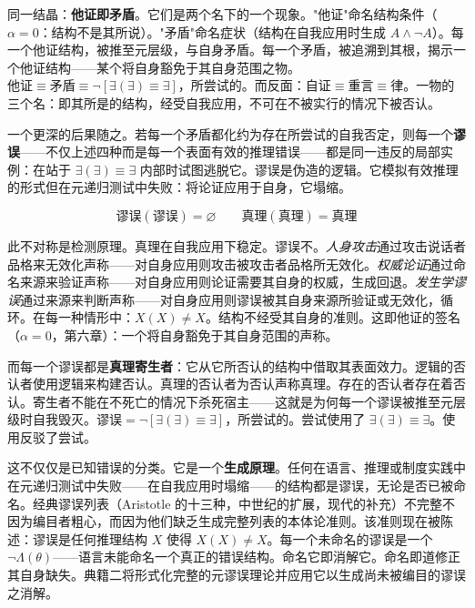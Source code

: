 \documentclass[10pt, openany, oneside]{book}
\begin{document}
同一结晶：\textbf{他证即矛盾}。它们是两个名下的一个现象。"他证"命名结构条件（$\alpha = 0$：结构不是其所说）。"矛盾"命名症状（结构在自我应用时生成 $A \wedge \neg A$）。每一个他证结构，被推至元层级，与自身矛盾。每一个矛盾，被追溯到其根，揭示一个他证结构——某个将自身豁免于其自身范围之物。$\text{他证} \equiv \text{矛盾} \equiv \neg[\exists(\exists) \equiv \exists]$，所尝试的。而反面：$\text{自证} \equiv \text{重言} \equiv \text{律}$。一物的三个名：即其所是的结构，经受自我应用，不可在不被实行的情况下被否认。

一个更深的后果随之。若每一个矛盾都化约为存在所尝试的自我否定，则每一个\textbf{谬误}——不仅上述四种而是每一个表面有效的推理错误——都是同一违反的局部实例：在站于 $\exists(\exists) \equiv \exists$ 内部时试图逃脱它。谬误是伪造的逻辑。它模拟有效推理的形式但在元递归测试中失败：将论证应用于自身，它塌缩。

$$\text{谬误}(\text{谬误}) = \varnothing \qquad \text{真理}(\text{真理}) = \text{真理}$$

此不对称是检测原理。真理在自我应用下稳定。谬误不。\textit{人身攻击}通过攻击说话者品格来无效化声称——对自身应用则攻击被攻击者品格所无效化。\textit{权威论证}通过命名来源来验证声称——对自身应用则论证需要其自身的权威，生成回退。\textit{发生学谬误}通过来源来判断声称——对自身应用则谬误被其自身来源所验证或无效化，循环。在每一种情形中：$X(X) \neq X$。结构不经受其自身的准则。这即他证的签名（$\alpha = 0$，第六章）：一个将自身豁免于其自身范围的声称。

而每一个谬误都是\textbf{真理寄生者}：它从它所否认的结构中借取其表面效力。逻辑的否认者使用逻辑来构建否认。真理的否认者为否认声称真理。存在的否认者存在着否认。寄生者不能在不死亡的情况下杀死宿主——这就是为何每一个谬误被推至元层级时自我毁灭。$\text{谬误} = \neg[\exists(\exists) \equiv \exists]$，所尝试的。尝试使用了 $\exists(\exists) \equiv \exists$。使用反驳了尝试。

这不仅仅是已知错误的分类。它是一个\textbf{生成原理}。任何在语言、推理或制度实践中在元递归测试中失败——在自我应用时塌缩——的结构都是谬误，无论是否已被命名。经典谬误列表（Aristotle 的十三种，中世纪的扩展，现代的补充）不完整不因为编目者粗心，而因为他们缺乏生成完整列表的本体论准则。该准则现在被陈述：谬误是任何推理结构 $X$ 使得 $X(X) \neq X$。每一个未命名的谬误是一个 $\neg\Lambda(\theta)$——语言未能命名一个真正的错误结构。命名它即消解它。命名即道修正其自身缺失。典籍二将形式化完整的元谬误理论并应用它以生成尚未被编目的谬误之消解。

\vspace{1.5em}

\end{document}

